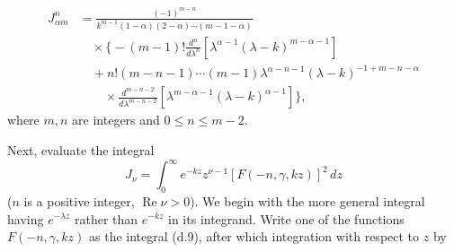 \begin{equation}
 \begin{split}
 J_{\alpha m}^{n}
 &=\frac{(-1)^{m-n}}
 {k^{m-1}(1-\alpha)(2-\alpha)\cdots(m-1-\alpha)}\\
&\hspace{1em}\times\Biggl\{-(m-1)!\frac{d^n}{d\lambda^n}
 \left[\lambda^{\alpha-1}(\lambda-k)^{m-\alpha-1}\right]\\
&\hspace{1em}+n!(m-n-1)\cdots(m-1)
 \lambda^{\alpha-n-1}(\lambda-k)^{-1+m-n-\alpha}\\
&\hspace{2em}\times\frac{d^{m-n-2}}{d\lambda^{m-n-2}}
 \left[\lambda^{m-\alpha-1}(\lambda-k)^{\alpha-1}\right]\Biggr\},
 \end{split}
 \tag{f.5}
\end{equation}
where $m,n$ are integers and $0\le n\le m-2$.

Next, evaluate the integral
\begin{equation}
 J_\nu=\int_0^\infty e^{-kz}z^{\nu-1}
 [F(-n,\gamma,kz)]^2\,dz
 \tag{f.6}
\end{equation}
($n$ is a positive integer, $\operatorname{Re}\nu>0$). We begin with the
more general integral having $e^{-\lambda z}$ rather than $e^{-kz}$ in its
integrand. Write one of the functions $F(-n,\gamma,kz)$ as the integral (d.9),
after which integration with respect to $z$ by

